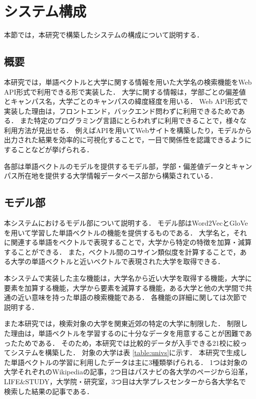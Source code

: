 \section{システム構成}
本節では，本研究で構築したシステムの構成について説明する．

\subsection{概要}
本研究では，単語ベクトルと大学に関する情報を用いた大学名の検索機能をWeb API形式で利用できる形で実装した．
大学に関する情報は，学部ごとの偏差値とキャンパス名，大学ごとのキャンパスの緯度経度を用いる．
Web API形式で実装した理由は，フロントエンド，バックエンド問わずに利用できるためである．
また特定のプログラミング言語にとらわれずに利用できることで，様々な利用方法が見出せる．
例えばAPIを用いてWebサイトを構築したり，モデルから出力された結果を効率的に可視化することで，一目で関係性を認識できるようにすることなどが挙げられる．

各部は単語ベクトルのモデルを提供するモデル部，学部・偏差値データとキャンパス所在地を提供する大学情報データベース部から構築されている．


\subsection{モデル部}
本システムにおけるモデル部について説明する．
モデル部はWord2VecとGloVeを用いて学習した単語ベクトルの機能を提供するものである．
大学名と，それに関連する単語をベクトルで表現することで，大学から特定の特徴を加算・減算することができる．
また，ベクトル間のコサイン類似度を計算することで，ある大学の単語ベクトルと近いベクトルで表現された大学を取得できる．

本システムで実装した主な機能は，大学名から近い大学を取得する機能，大学に要素を加算する機能，大学から要素を減算する機能，ある大学と他の大学間で共通の近い意味を持った単語の検索機能である．
各機能の詳細に関しては次節で説明する．

また本研究では，検索対象の大学を関東近郊の特定の大学に制限した．
制限した理由は，単語ベクトルを学習するのに十分なデータを用意することが困難であったためである．
そのため，本研究では比較的データが入手できる21校に絞ってシステムを構築した．
対象の大学は表 \ref{table:univs}に示す．
本研究で生成した単語ベクトルの学習に利用したデータは主に3種類挙げられる．
1つは対象の大学それぞれのWikipediaの記事，2つ目はパスナビの各大学のページから沿革，LIFE\&STUDY，大学院・研究室，3つ目は大学プレスセンターから各大学名で検索した結果の記事である．

